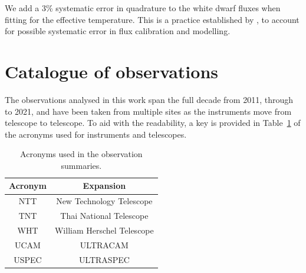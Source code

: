 We add a 3\% systematic error in quadrature to the white dwarf fluxes when fitting for the effective temperature. This is a practice established by \citet{McAllister2019}, to account for possible systematic error in flux calibration and modelling.

\newpage
\section{Catalogue of observations}
\label{sect:observing:observation catalogue}

The observations analysed in this work span the full decade from 2011, through to 2021, and have been taken from multiple sites as the instruments move from telescope to telescope. To aid with the readability, a key is provided in Table~\ref{tab:observation acronyms} of the acronyms used for instruments and telescopes.

\begin{table}
    \centering
    \begin{tabular}{c|c}
        Acronym & Expansion \\
        \hline
        NTT & New Technology Telescope \\
        TNT & Thai National Telescope \\
        WHT & William Herschel Telescope \\
        UCAM & ULTRACAM \\
        USPEC & ULTRASPEC \\
    \end{tabular}
    \caption{Acronyms used in the observation summaries.}
    \label{tab:observation acronyms}
\end{table}


\begin{landscape}

    
    
    
    
    
    
    
    
    
    
    
    
    

\end{landscape}
